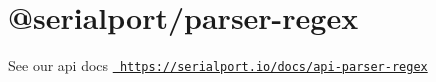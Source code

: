 \chapter{@serialport/parser-\/regex}
\hypertarget{md_Dashboard_2node__modules_2_0dserialport_2parser-regex_2README}{}\label{md_Dashboard_2node__modules_2_0dserialport_2parser-regex_2README}
\label{md_Dashboard_2node__modules_2_0dserialport_2parser-regex_2README_autotoc_md90}%
%
 See our api docs \href{https://serialport.io/docs/api-parser-regex}{\texttt{ https\+://serialport.\+io/docs/api-\/parser-\/regex}} 